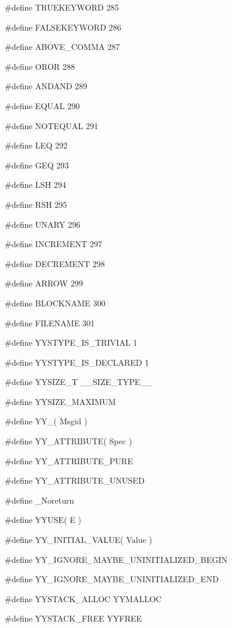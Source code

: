 \medskip
{\stt \#define TRUEKEYWORD 285}

\medskip
{\stt \#define FALSEKEYWORD 286}

\medskip
{\stt \#define ABOVE\_COMMA 287}

\medskip
{\stt \#define OROR 288}

\medskip
{\stt \#define ANDAND 289}

\medskip
{\stt \#define EQUAL 290}

\medskip
{\stt \#define NOTEQUAL 291}

\medskip
{\stt \#define LEQ 292}

\medskip
{\stt \#define GEQ 293}

\medskip
{\stt \#define LSH 294}

\medskip
{\stt \#define RSH 295}

\medskip
{\stt \#define UNARY 296}

\medskip
{\stt \#define INCREMENT 297}

\medskip
{\stt \#define DECREMENT 298}

\medskip
{\stt \#define ARROW 299}

\medskip
{\stt \#define BLOCKNAME 300}

\medskip
{\stt \#define FILENAME 301}

\medskip
{\stt \#define YYSTYPE\_IS\_TRIVIAL 1}

\medskip
{\stt \#define YYSTYPE\_IS\_DECLARED 1}

\medskip
{\stt \#define YYSIZE\_T \_\_SIZE\_TYPE\_\_}

\medskip
{\stt \#define YYSIZE\_MAXIMUM}

\medskip
{\stt \#define YY\_( Msgid )}

\medskip
{\stt \#define YY\_ATTRIBUTE( Spec )}

\medskip
{\stt \#define YY\_ATTRIBUTE\_PURE}

\medskip
{\stt \#define YY\_ATTRIBUTE\_UNUSED}

\medskip
{\stt \#define \_Noreturn}

\medskip
{\stt \#define YYUSE( E )}

\medskip
{\stt \#define YY\_INITIAL\_VALUE( Value )}

\medskip
{\stt \#define YY\_IGNORE\_MAYBE\_UNINITIALIZED\_BEGIN}

\medskip
{\stt \#define YY\_IGNORE\_MAYBE\_UNINITIALIZED\_END}

\medskip
{\stt \#define YYSTACK\_ALLOC YYMALLOC}

\medskip
{\stt \#define YYSTACK\_FREE YYFREE}

